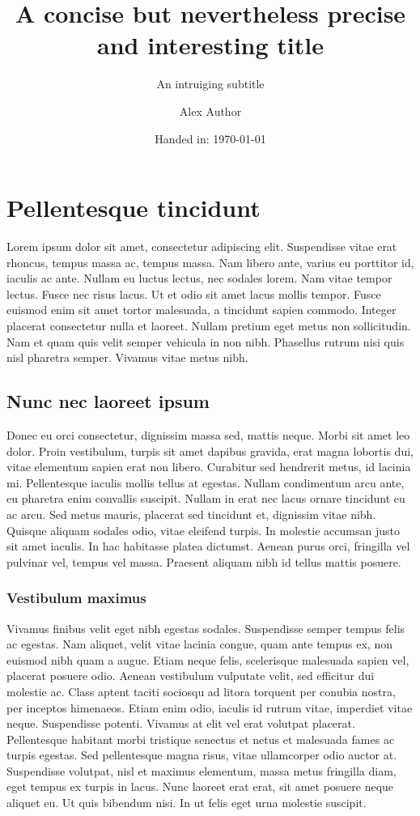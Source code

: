 \documentclass[11pt, a4paper]{article}
\author{Alex Author}
\title{A concise but nevertheless precise and interesting title}
\subtitle{An intruiging subtitle}
\date{Handed in: \today}
\begin{document}
\maketitle

\tableofcontents

\section{Pellentesque tincidunt}
Lorem ipsum dolor sit amet, consectetur adipiscing elit. Suspendisse vitae erat rhoncus, tempus massa ac, tempus massa. Nam libero ante, varius eu porttitor id, iaculis ac ante. Nullam eu luctus lectus, nec sodales lorem. Nam vitae tempor lectus. Fusce nec risus lacus. Ut et odio sit amet lacus mollis tempor. Fusce euismod enim sit amet tortor malesuada, a tincidunt sapien commodo. Integer placerat consectetur nulla et laoreet. Nullam pretium eget metus non sollicitudin. Nam et quam quis velit semper vehicula in non nibh. Phasellus rutrum nisi quis nisl pharetra semper. Vivamus vitae metus nibh.

\subsection{Nunc nec laoreet ipsum}
Donec eu orci consectetur, dignissim massa sed, mattis neque. Morbi sit amet leo dolor. Proin vestibulum, turpis sit amet dapibus gravida, erat magna lobortis dui, vitae elementum sapien erat non libero. Curabitur sed hendrerit metus, id lacinia mi. Pellentesque iaculis mollis tellus at egestas. Nullam condimentum arcu ante, eu pharetra enim convallis suscipit. Nullam in erat nec lacus ornare tincidunt eu ac arcu. Sed metus mauris, placerat sed tincidunt et, dignissim vitae nibh. Quisque aliquam sodales odio, vitae eleifend turpis. In molestie accumsan justo sit amet iaculis. In hac habitasse platea dictumst. Aenean purus orci, fringilla vel pulvinar vel, tempus vel massa. Praesent aliquam nibh id tellus mattis posuere.

\subsubsection{Vestibulum maximus}
Vivamus finibus velit eget nibh egestas sodales. Suspendisse semper tempus felis ac egestas. Nam aliquet, velit vitae lacinia congue, quam ante tempus ex, non euismod nibh quam a augue. Etiam neque felis, scelerisque malesuada sapien vel, placerat posuere odio. Aenean vestibulum vulputate velit, sed efficitur dui molestie ac. Class aptent taciti sociosqu ad litora torquent per conubia nostra, per inceptos himenaeos. Etiam enim odio, iaculis id rutrum vitae, imperdiet vitae neque. Suspendisse potenti. Vivamus at elit vel erat volutpat placerat. Pellentesque habitant morbi tristique senectus et netus et malesuada fames ac turpis egestas. Sed pellentesque magna risus, vitae ullamcorper odio auctor at. Suspendisse volutpat, nisl et maximus elementum, massa metus fringilla diam, eget tempus ex turpis in lacus. Nunc laoreet erat erat, sit amet posuere neque aliquet eu. Ut quis bibendum nisi. In ut felis eget urna molestie suscipit.
\end{document}
